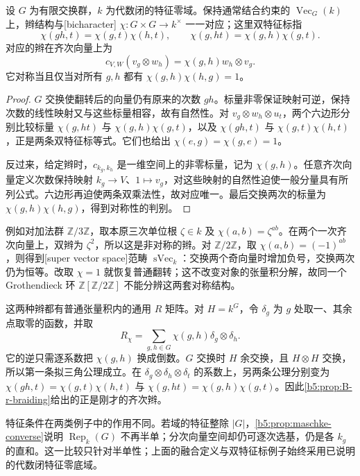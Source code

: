 \begin{proposition}\label{b5:prop:B-graded-braiding}
	设 \(G\) 为有限交换群，\(k\) 为代数闭的特征零域。保持通常结合约束的 \(\operatorname{Vec}_G(k)\) 上，辫结构与[bicharacter] \(\chi:G\times G\to k^\times\) 一一对应；这里双特征标指
	\[
		\chi(gh,t)=\chi(g,t)\chi(h,t),\qquad
		\chi(g,ht)=\chi(g,h)\chi(g,t).
	\]
	对应的辫在齐次向量上为
	\[
		c_{V,W}(v_g\otimes w_h)=\chi(g,h)w_h\otimes v_g.
	\]
	它对称当且仅当对所有 \(g,h\) 都有 \(\chi(g,h)\chi(h,g)=1\)。
\end{proposition}
\begin{proof}
	\(G\) 交换使翻转后的向量仍有原来的次数 \(gh\)。标量非零保证映射可逆，保持次数的线性映射又与这些标量相容，故有自然性。对 \(v_g\otimes w_h\otimes u_t\)，两个六边形分别比较标量 \(\chi(g,ht)\) 与 \(\chi(g,h)\chi(g,t)\)，以及 \(\chi(gh,t)\) 与 \(\chi(g,t)\chi(h,t)\)，正是两条双特征标等式。它们也给出 \(\chi(e,g)=\chi(g,e)=1\)。

	反过来，给定辫时，\(c_{k_g,k_h}\) 是一维空间上的非零标量，记为 \(\chi(g,h)\)。任意齐次向量定义次数保持映射 \(k_g\to V\)、\(1\mapsto v_g\)，对这些映射的自然性迫使一般分量具有所列公式。六边形再迫使两条双乘法性，故对应唯一。最后交换两次的标量为 \(\chi(g,h)\chi(h,g)\)，得到对称性的判别。
\end{proof}

例如对加法群 \(\mathbb Z/3\mathbb Z\)，取本原三次单位根 \(\zeta\in k\) 及 \(\chi(a,b)=\zeta^{ab}\)。在两个一次齐次向量上，双辫为 \(\zeta^2\)，所以这是非对称的辫。对 \(\mathbb Z/2\mathbb Z\)，取 \(\chi(a,b)=(-1)^{ab}\)，则得到[super vector space]范畴 \(\operatorname{sVec}_k\)：交换两个奇向量时增加负号，交换两次仍为恒等。改取 \(\chi=1\) 就恢复普通翻转；这不改变对象的张量积分解，故同一个 Grothendieck 环 \(\mathbb Z[\mathbb Z/2\mathbb Z]\) 不能分辨这两套对称结构。

\ProseParagraphBreak
这两种辫都有普通张量积内的通用 \(R\) 矩阵。对 \(H=k^G\)，令 \(\delta_g\) 为 \(g\) 处取一、其余点取零的函数，并取
\[
	R_\chi=\sum_{g,h\in G}\chi(g,h)\delta_g\otimes\delta_h.
\]
它的逆只需逐系数把 \(\chi(g,h)\) 换成倒数。\(G\) 交换时 \(H\) 余交换，且 \(H\otimes H\) 交换，所以第一条拟三角公理成立。在 \(\delta_g\otimes\delta_h\otimes\delta_t\) 的系数上，另两条公理分别变为 \(\chi(gh,t)=\chi(g,t)\chi(h,t)\) 与 \(\chi(g,ht)=\chi(g,h)\chi(g,t)\)。因此\cref{b5:prop:B-r-braiding}给出的正是刚才的齐次辫。

\ProseParagraphBreak
特征条件在两类例子中的作用不同。若域的特征整除 \(|G|\)，\cref{b5:prop:maschke-converse}说明 \(\operatorname{Rep}_k(G)\) 不再半单；分次向量空间却仍可逐次选基，仍是各 \(k_g\) 的直和。这一比较只针对半单性；上面的融合定义与双特征标例子始终采用已说明的代数闭特征零底域。

